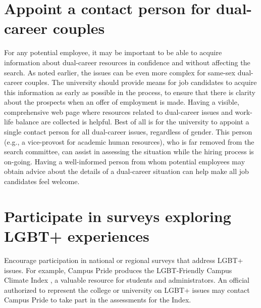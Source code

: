 \section {Appoint a contact person for dual-career couples}
\label{dual-career-contact}
For any potential employee, it may be important to be able to acquire information about dual-career resources in confidence and without affecting the search.  As noted earlier, the issues can be even more complex for same-sex dual-career couples. The university should provide means for job candidates to acquire this information as early as possible in the process, to ensure that there is clarity about the prospects when an offer of employment is made.  Having a visible, comprehensive web page where resources related to dual-career issues and work-life balance are collected is helpful.  Best of all is for the university to appoint a {single contact person for all dual-career issues, regardless of gender}. This person (e.g., a vice-provost for academic human resources), who is far removed from the search committee, can assist in assessing the situation while the hiring process is on-going.  Having a well-informed person from whom potential employees may obtain advice about the details of a dual-career situation can help make all job candidates feel welcome.


\section {Participate in surveys exploring LGBT+ experiences}
\label{univ-surveys}
Encourage participation in {national or regional surveys} that address LGBT+ issues. For example, Campus Pride produces the LGBT-Friendly Campus Climate Index , a valuable resource for students and administrators. An official authorized to represent the college or university on LGBT+ issues may contact Campus Pride to take part in the assessments for the Index.


















